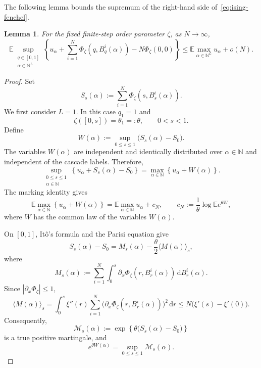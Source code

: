 \documentclass[a4paper,10pt,reqno]{amsart}
\numberwithin{equation}{section}
\newtheorem{lemma}[proposition]{Lemma}%
\newcommand{\dN}{\mathbb{N}}%
\newcommand{\dE}{\mathbb{E}}%
\newcommand{\dd}{\mathrm{d}}
\begin{document}
	The following lemma bounds the supremum of the right-hand side
	of~\eqref{eq:ising-fenchel}.
	
	
	\begin{lemma}\label{lem:parisi-maximal-estimate}
		For the fixed finite-step order parameter $\zeta$, as
		$N\to\infty$,
		\begin{equation}\label{eq:star1}
			\dE
			\sup_{\substack{q\in[0,1]\\ \alpha\in\dN^L}}
			\left\{
			u_\alpha
			+
			\sum_{i=1}^N
			\Phi_\zeta(q,B_q^i(\alpha))
			-
			N\Phi_\zeta(0,0)
			\right\}
			\le
			\dE\max_{\alpha\in\dN^L}u_\alpha
			+
			o(N).
		\end{equation}
	\end{lemma}
	
	
	
	
	\begin{proof}
		Set
		\[
		S_s(\alpha):=
		\sum_{i=1}^N\Phi_\zeta(s,B_s^i(\alpha)).
		\]
		We first consider $L=1$. In this case $q_1=1$ and
		\[
		\zeta([0,s])=\theta_1=:\theta,
		\qquad 0<s<1.
		\]
		Define
		\[
		W(\alpha):=
		\sup_{0\le s\le1}
		\bigl(S_s(\alpha)-S_0\bigr).
		\]
		The variables $W(\alpha)$ are independent and identically
		distributed over $\alpha\in\dN$ and independent of the cascade
		labels. Therefore,
		\[
		\sup_{\substack{0\le s\le1\\ \alpha\in\dN}}
		\left\{
		u_\alpha+S_s(\alpha)-S_0
		\right\}
		=
		\max_{\alpha\in\dN}
		\left\{
		u_\alpha+W(\alpha)
		\right\}.
		\]
		The marking identity gives
		\[
		\dE
		\max_{\alpha\in\dN}
		\left\{
		u_\alpha+W(\alpha)
		\right\}
		=
		\dE\max_{\alpha\in\dN}u_\alpha+c_N,
		\qquad
		c_N:=
		\frac1\theta\log\dE e^{\theta W},
		\]
		where $W$ has the common law of the variables $W(\alpha)$.
		
		On $[0,1]$, It\^o's formula and the Parisi equation give
		\[
		S_s(\alpha)-S_0
		=
		M_s(\alpha)
		-\frac \theta2\langle M(\alpha)\rangle_s,
		\]
		where
		\[
		M_s(\alpha)
		:=
		\sum_{i=1}^N
		\int_0^s
		\partial_x\Phi_\zeta(r,B_r^i(\alpha))
		\,\dd B_r^i(\alpha).
		\]
		Since $|\partial_x\Phi_\zeta|\le1$,
		\[
		\langle M(\alpha)\rangle_s
		=
		\int_0^s
		\xi''(r)
		\sum_{i=1}^N
		\bigl(
		\partial_x\Phi_\zeta(r,B_r^i(\alpha))
		\bigr)^2
		\,\dd r
		\le
		N\bigl(\xi'(s)-\xi'(0)\bigr).
		\]
		Consequently,
		\[
		\mathcal M_s(\alpha)
		:=
		\exp\left\{
		\theta\bigl(S_s(\alpha)-S_0\bigr)
		\right\}
		\]
		is a true positive martingale, and
		\[
		e^{\theta W(\alpha)}
		=
		\sup_{0\le s\le1}\mathcal M_s(\alpha).
		\]
		

\end{proof}
\end{document}
